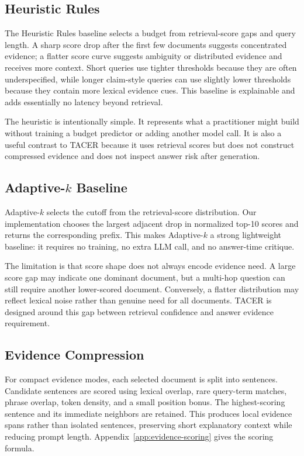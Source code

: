 \documentclass[11pt]{article}
\begin{document}
\subsection{Heuristic Rules}

The Heuristic Rules baseline selects a budget from retrieval-score gaps and query length. A sharp score drop after the first few documents suggests concentrated evidence; a flatter score curve suggests ambiguity or distributed evidence and receives more context. Short queries use tighter thresholds because they are often underspecified, while longer claim-style queries can use slightly lower thresholds because they contain more lexical evidence cues. This baseline is explainable and adds essentially no latency beyond retrieval.

The heuristic is intentionally simple. It represents what a practitioner might build without training a budget predictor or adding another model call. It is also a useful contrast to TACER because it uses retrieval scores but does not construct compressed evidence and does not inspect answer risk after generation.

\subsection{Adaptive-$k$ Baseline}

Adaptive-$k$ selects the cutoff from the retrieval-score distribution. Our implementation chooses the largest adjacent drop in normalized top-10 scores and returns the corresponding prefix. This makes Adaptive-$k$ a strong lightweight baseline: it requires no training, no extra LLM call, and no answer-time critique.

The limitation is that score shape does not always encode evidence need. A large score gap may indicate one dominant document, but a multi-hop question can still require another lower-scored document. Conversely, a flatter distribution may reflect lexical noise rather than genuine need for all documents. TACER is designed around this gap between retrieval confidence and answer evidence requirement.

\subsection{Evidence Compression}

For compact evidence modes, each selected document is split into sentences. Candidate sentences are scored using lexical overlap, rare query-term matches, phrase overlap, token density, and a small position bonus. The highest-scoring sentence and its immediate neighbors are retained. This produces local evidence spans rather than isolated sentences, preserving short explanatory context while reducing prompt length. Appendix~\ref{app:evidence-scoring} gives the scoring formula.
\end{document}
